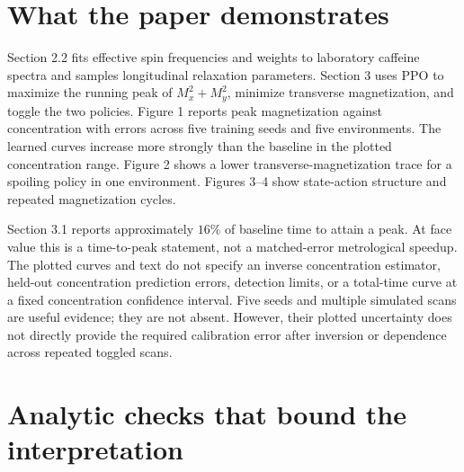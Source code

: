 \documentclass[10pt]{article}
\begin{document}
\section*{What the paper demonstrates}
Section 2.2 fits effective spin frequencies and weights to laboratory caffeine spectra and samples longitudinal relaxation parameters. Section 3 uses PPO to maximize the running peak of \(M_x^2+M_y^2\), minimize transverse magnetization, and toggle the two policies. Figure 1 reports peak magnetization against concentration with errors across five training seeds and five environments. The learned curves increase more strongly than the baseline in the plotted concentration range. Figure 2 shows a lower transverse-magnetization trace for a spoiling policy in one environment. Figures 3–4 show state-action structure and repeated magnetization cycles.\par
Section 3.1 reports approximately \(16\%\) of baseline time to attain a peak. At face value this is a time-to-peak statement, not a matched-error metrological speedup. The plotted curves and text do not specify an inverse concentration estimator, held-out concentration prediction errors, detection limits, or a total-time curve at a fixed concentration confidence interval. Five seeds and multiple simulated scans are useful evidence; they are not absent. However, their plotted uncertainty does not directly provide the required calibration error after inversion or dependence across repeated toggled scans.\par
\section*{Analytic checks that bound the interpretation}
\end{document}
